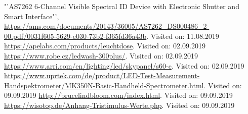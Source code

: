 \documentclass[11pt]{scrartcl}
\begin{document}
\begin{thebibliography}{xxxxxxxxxxxxxxxxxxx}
    "'AS7262 6-Channel Visible Spectral ID Device with Electronic Shutter and Smart Interface"', \url{https://ams.com/documents/20143/36005/AS7262_DS000486_2-00.pdf/0031f605-5629-e030-73b2-f365fd36a43b}. Visited on: 11.08.2019
     \url{https://apelabs.com/products/leuchtdose}. Visited on: 02.09.2019
     \url{https://www.robe.cz/ledwash-300plus/}. Visited on: 02.09.2019
     \url{https://www.arri.com/en/lighting/led/skypanel/s60-c}. Visited on: 02.09.2019
     \url{https://www.uprtek.com/de/product/LED-Test-Measurement-Handspektrometer/MK350N-Basic-Handheld-Spectrometer.html}. Visited on: 09.09.2019
     \url{http://brucelindbloom.com/index.html}. Visited on: 09.09.2019
     \url{https://wisotop.de/Anhang-Tristimulus-Werte.php}. Visited on: 09.09.2019
 \end{thebibliography}
 \endgroup
\clearpage

\end{document}
